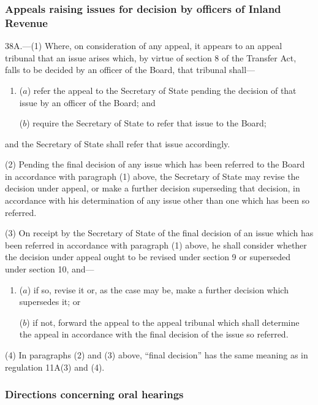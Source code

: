 \documentclass[12pt,a4paper]{article}
\begin{document}
\subsubsection[38A. Appeals raising issues for decision by officers of Inland Revenue]{Appeals raising issues for decision by officers of Inland Revenue}

38A.---(1)  Where, on consideration of any appeal, it appears to an appeal tribunal that an issue arises which, by virtue of section 8 of the Transfer Act, falls to be decided by an officer of the Board, that tribunal shall—
\begin{enumerate}\item[]
($a$) refer the appeal to the Secretary of State pending the decision of that issue by an officer of the Board; and

($b$) require the Secretary of State to refer that issue to the Board;
\end{enumerate}
and the Secretary of State shall refer that issue accordingly.

(2) Pending the final decision of any issue which has been referred to the Board in accordance with paragraph (1) above, the Secretary of State may revise the decision under appeal, or make a further decision superseding that decision, in accordance with his determination of any issue other than one which has been so referred.

(3) On receipt by the Secretary of State of the final decision of an issue which has been referred in accordance with paragraph (1) above, he shall consider whether the decision under appeal ought to be revised under section 9 or superseded under section 10, and—
\begin{enumerate}\item[]
($a$) if so, revise it or, as the case may be, make a further decision which supersedes it; or

($b$) if not, forward the appeal to the appeal tribunal which shall determine the appeal in accordance with the final decision of the issue so referred.
\end{enumerate}

(4) In paragraphs (2) and (3) above, “final decision” has the same meaning as in regulation 11A(3) and (4).


\subsubsection[39. Directions concerning oral hearings]{Directions concerning oral hearings}
\end{document}
